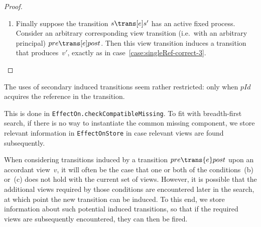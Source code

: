 \begin{proof}
\begin{enumerate}
\item
Finally suppose the transition $s \trans[e] s'$ has an active fixed process.
Consider an arbitrary corresponding view transition (i.e.~with an arbitrary
principal) $pre \trans[e] post$.  Then this view transition induces a
transition that produces~$v'$, exactly as in
case~\ref{case:singleRef-correct-3}.
\end{enumerate}
\end{proof}


\begin{improve}
The uses of secondary induced transitions seem rather restricted: only when
$pId$ acquires the reference in the transition. 
\end{improve}


\begin{impNote}
This is done in \texttt{EffectOn.\linebreak[1]check\-Compatible\-Missing}.  To
fit with breadth-first search, if there is no way to instantiate the common
missing component, we store relevant information in \texttt{EffectOnStore} in
case relevant views are found subsequently.
\end{impNote}

\begin{impNote}
When considering transitions induced by a transition $pre \trans{e} post$ upon
an accordant view~$v$, it will often be the case that one or both of the
conditions~(b) or~(c) does not hold with the current set of views.  However,
it is possible that the additional views required by those conditions are
encountered later in the search, at which point the new transition can be
induced.  To this end, we store information about such potential induced
transitions, so that if the required views are subsequently encountered, they
can then be fired.
\end{impNote}
